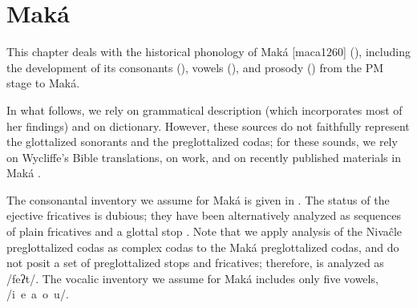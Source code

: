 \chapter{Maká} \label{mk}

This chapter deals with the historical phonology of Maká [maca1260] (), including the development of its consonants (), vowels (), and prosody () from the PM stage to Maká.

In what follows, we rely on  grammatical description (which incorporates most of her \citeyear{AG89} findings) and on  dictionary. However, these sources do not faithfully represent the glottalized sonorants and the preglottalized codas; for these sounds, we rely on Wycliffe’s Bible translations, on  work, and on recently published materials in Maká \citep{unuuneiki,maka-etnomat,PMA}.

The consonantal inventory we assume for Maká is given in . The status of the ejective fricatives is dubious; they have been alternatively analyzed as sequences of plain fricatives and a glottal stop \citep{AG94}. Note that we apply  analysis of the Nivaĉle preglottalized codas as complex codas to the Maká preglottalized codas, and do not posit a set of preglottalized stops and fricatives; therefore,  is analyzed as /feʔt/. The vocalic inventory we assume for Maká includes only five vowels, /i~e~a~o~u/. 

\begin{table}
\caption{Maká consonants}
\label{mk-inv-cons}
\end{table}


